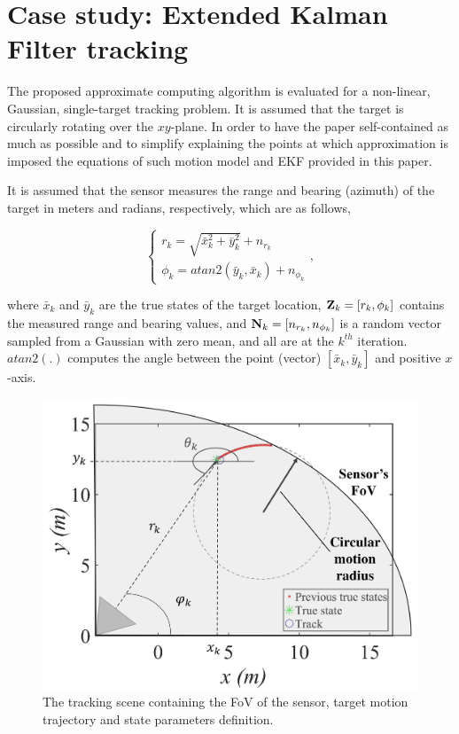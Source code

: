 \section{Case study: Extended Kalman Filter tracking}
\label{sec:EKF}
The proposed approximate computing algorithm is evaluated for a non-linear, Gaussian, single-target tracking problem. It is assumed that the target is circularly rotating over the $xy$-plane. In order to have the paper self-contained as much as possible and to simplify explaining the points at which approximation is imposed the equations of such motion model and EKF provided in this paper.

It is assumed that the sensor measures the range and bearing (azimuth) of the target in meters and radians, respectively, which are as follows,

\begin{equation}
\left\{
\begin{array}{l}
r_k = \sqrt{\bar{x}_k^2 + \bar{y}_k^2} + n_{r_k} \\
\phi_k = atan2(\bar{y}_k, \bar{x}_k) + n_{\phi_k}
\end{array}
\right.,
\label{eq:Meas}
\end{equation}

\noindent where $\bar{x}_k$ and $\bar{y}_k$ are the true states of the target location, ${\bf Z}_k = [r_k, \phi_k]$ contains the measured range and bearing values, and ${\bf N}_k = [n_{r_k}, n_{\phi_k}]$ is a random vector sampled from a Gaussian with zero mean, and all are at the $k^{th}$ iteration. $atan2(.)$ computes the angle between the point (vector) $[\bar{x}_k, \bar{y}_k]$ and positive $x$-axis.

\begin{figure}[tb]
  \centering
  \includegraphics[width=0.95\columnwidth]{img/Trackingfinal.png}
  \caption{The tracking scene containing the FoV of the sensor, target motion trajectory and state parameters definition.}
  \label{fig:TrackScene}
\end{figure}

